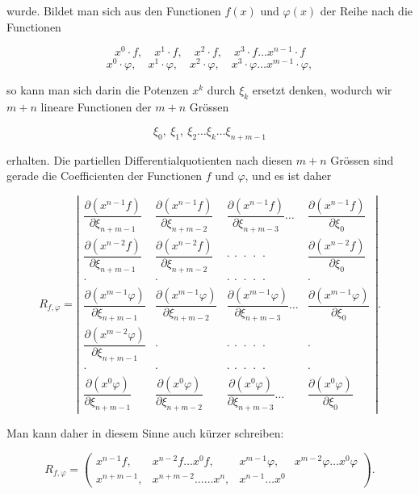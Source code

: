 wurde. Bildet man sich aus den Functionen $f(x)$ und $\varphi(x)$ der Reihe nach die
Functionen

\[ x^0\cdot f,\quad x^1\cdot f,\quad x^2\cdot f,\quad x^3\cdot f \ldots x^{n-1}\cdot f \]
\[ x^0\cdot \varphi,\quad x^1\cdot \varphi,\quad x^2\cdot \varphi,\quad x^3\cdot \varphi
\ldots x^{m-1}\cdot \varphi, \]

so kann man sich darin die Potenzen $x^k$ durch $\xi_k$ ersetzt denken, wodurch wir $m+n$
lineare Functionen der $m+n$ Gr\"ossen

\[ \xi_0,\ \xi_1,\ \xi_2 \ldots \xi_k \ldots \xi_{n+m-1} \]

erhalten. Die partiellen Differentialquotienten nach diesen $m+n$ Gr\"ossen sind gerade die
Coefficienten der Functionen $f$ und $\varphi$, und es ist daher

\[
R_{f,\varphi} =
\left|
\begin{array}{cccc}
\dfrac{\partial(x^{n-1}f)}{\partial\xi_{n+m-1}} & \dfrac{\partial(x^{n-1}f)}{\partial\xi_{n+m-2}} & \dfrac{\partial(x^{n-1}f)}{\partial\xi_{n+m-3}} \ldots & \dfrac{\partial(x^{n-1}f)}{\partial\xi_0} \\[2ex]
\dfrac{\partial(x^{n-2}f)}{\partial\xi_{n+m-1}} & \dfrac{\partial(x^{n-2}f)}{\partial\xi_{n+m-2}} & \cdot\ \cdot\ \cdot\ \cdot\ \cdot & \dfrac{\partial(x^{n-2}f)}{\partial\xi_0} \\[2ex]
\cdot & \cdot & \cdot\ \cdot\ \cdot\ \cdot\ \cdot & \cdot \\[1ex]
\dfrac{\partial(x^{m-1}\varphi)}{\partial\xi_{n+m-1}} & \dfrac{\partial(x^{m-1}\varphi)}{\partial\xi_{n+m-2}} & \dfrac{\partial(x^{m-1}\varphi)}{\partial\xi_{n+m-3}} \ldots & \dfrac{\partial(x^{m-1}\varphi)}{\partial\xi_0} \\[2ex]
\dfrac{\partial(x^{m-2}\varphi)}{\partial\xi_{n+m-1}} & \cdot & \cdot\ \cdot\ \cdot\ \cdot\ \cdot & \cdot \\[1ex]
\cdot & \cdot & \cdot\ \cdot\ \cdot\ \cdot\ \cdot & \cdot \\[1ex]
\dfrac{\partial(x^0\varphi)}{\partial\xi_{n+m-1}} & \dfrac{\partial(x^0\varphi)}{\partial\xi_{n+m-2}} & \dfrac{\partial(x^0\varphi)}{\partial\xi_{n+m-3}} \ldots & \dfrac{\partial(x^0\varphi)}{\partial\xi_0}
\end{array}
\right| .
\]

Man kann daher in diesem Sinne auch k\"urzer schreiben:

\[
R_{f,\varphi} =
\left(
\begin{array}{cccccc}
x^{n-1}f, & x^{n-2}f \ldots x^0f, & x^{m-1}\varphi, & x^{m-2}\varphi \ldots x^0\varphi \\
x^{n+m-1}, & x^{n+m-2}\ldots\ldots x^n, & x^{n-1}\ldots x^0
\end{array}
\right).
\]

